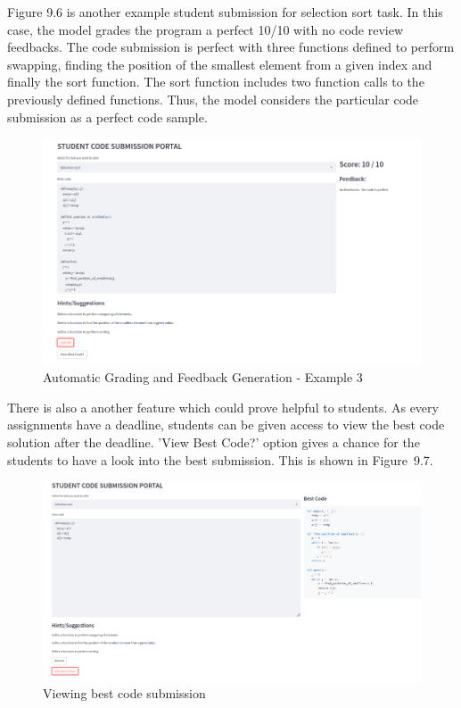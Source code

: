 Figure 9.6 is another example student submission for selection sort
task. In this case, the model grades the program a perfect 10/10 with
no code review feedbacks. The code submission is perfect with three
functions defined to perform swapping, finding the position of the
smallest element from a given index and finally the sort function. The
sort function includes two function calls to the previously defined
functions. Thus, the model considers the particular code submission as
a perfect code sample.


\begin{figure}[H]
\centering
\includegraphics[scale=0.6,frame]{./figures/dep6.png}
\caption{Automatic Grading and Feedback Generation - Example 3}
\label{fig5}
\end{figure}

There is also a another feature which could prove helpful to
students. As every assignments have a deadline, students can be given
access to view the best code solution after the deadline. 'View Best
Code?' option gives a chance for the students to have a look into the
best submission. This is shown in Figure~9.7.

\begin{figure}[H]
\centering
\includegraphics[scale=0.54,frame]{./figures/dep7.png}
\caption{Viewing best code submission}
\label{fig5}
\end{figure}



